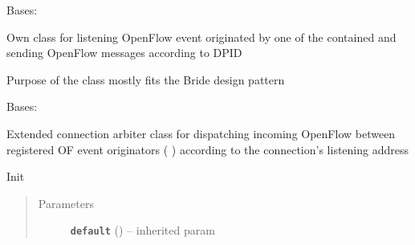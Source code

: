 \documentclass[letterpaper,10pt,english]{sphinxmanual}
\begin{document}
\begin{fulllineitems}
\label{util/pox_extension:escape.util.pox_extension.OpenFlowBridge}
Bases: 

Own class for listening OpenFlow event originated by one of the contained
 and sending OpenFlow messages according to DPID

Purpose of the class mostly fits the Bride design pattern

\end{fulllineitems}


\begin{fulllineitems}
\label{util/pox_extension:escape.util.pox_extension.ExtendedOFConnectionArbiter}
Bases: 

Extended connection arbiter class for dispatching incoming OpenFlow
 between registered OF event originators (
) according to the connection's listening address

\begin{fulllineitems}
\label{util/pox_extension:escape.util.pox_extension.ExtendedOFConnectionArbiter._core_name}
\end{fulllineitems}


\begin{fulllineitems}
\label{util/pox_extension:escape.util.pox_extension.ExtendedOFConnectionArbiter.__init__}
Init
\begin{quote}\begin{description}
\item[{Parameters}] \leavevmode
\textbf{\texttt{default}} () -- inherited param

\end{description}\end{quote}


\end{fulllineitems}
\end{fulllineitems}
\end{document}
